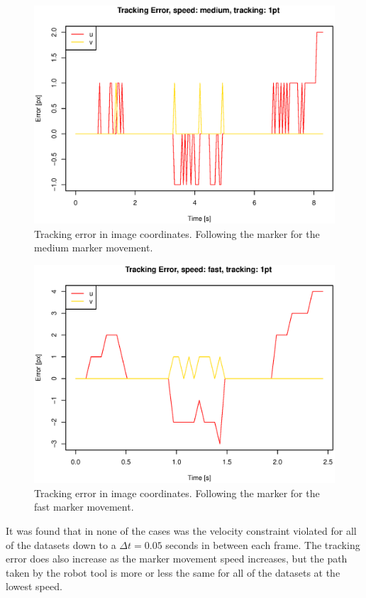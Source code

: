 \begin{figure}[H]
\centering
\includegraphics[width= \linewidth]{graphics/robotics/trackingError_medium_1pt}
\caption{Tracking error in image coordinates.
Following the marker for the medium marker movement.}
\label{fig:trackingerror_medium_1p}
\end{figure}


\begin{figure}[H]
\centering
\includegraphics[width= \linewidth]{graphics/robotics/trackingError_fast_1pt}
\caption{Tracking error in image coordinates.
Following the marker for the fast marker movement.}
\label{fig:trackingerror_fast_1p}
\end{figure}



It was found that in none of the cases was the velocity constraint violated for all of the datasets down to a $\Delta t = 0.05$ seconds in between each frame.
The tracking error does also increase as the marker movement speed increases, but the path taken by the robot tool is more or less the same for all of the datasets at the lowest speed.


